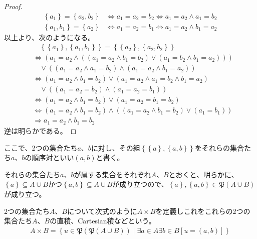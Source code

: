 \documentclass[a4paper]{jsarticle}
\begin{document}
\begin{proof}
\begin{align*}
\left\{ a_{1} \right\} = \left\{ a_{2},b_{2} \right\} &\Leftrightarrow a_{1} = a_{2} = b_{2} \Leftrightarrow a_{1} = a_{2} \land a_{1} = b_{2}\\
\left\{ a_{1},b_{1} \right\} = \left\{ a_{2} \right\} &\Leftrightarrow a_{1} = a_{2} = b_{1} \Leftrightarrow a_{1} = a_{2} \land b_{1} = a_{2}
\end{align*}
以上より、次のようになる。
\begin{align*}
&\quad \left\{ \left\{ a_{1} \right\},\left\{ a_{1},b_{1} \right\} \right\} = \left\{ \left\{ a_{2} \right\},\left\{ a_{2},b_{2} \right\} \right\}\\
&\Leftrightarrow \left( a_{1} = a_{2} \land \left( \left( a_{1} = a_{2} \land b_{1} = b_{2} \right) \vee \left( a_{1} = b_{2} \land b_{1} = a_{2} \right) \right) \right) \\
&\quad \vee \left( \left( a_{1} = a_{2} \land a_{1} = b_{2} \right) \land \left( a_{1} = a_{2} \land b_{1} = a_{2} \right) \right)\\
&\Leftrightarrow \left( a_{1} = a_{2} \land b_{1} = b_{2} \right) \vee \left( a_{1} = a_{2} \land a_{1} = b_{2} \land b_{1} = a_{2} \right) \\ 
&\quad \vee \left( \left( a_{1} = a_{2} = b_{2} \right) \land \left( a_{1} = a_{2} = b_{1} \right) \right)\\
&\Leftrightarrow \left( a_{1} = a_{2} \land b_{1} = b_{2} \right) \vee \left( a_{1} = a_{2} = b_{1} = b_{2} \right)\\
&\Leftrightarrow \left( a_{1} = a_{2} \land b_{1} = b_{2} \right) \land \left( \left( a_{1} = a_{2} \land b_{1} = b_{2} \right) \vee \left( a_{1} = b_{1} \right) \right)\\
&\Rightarrow a_{1} = a_{2} \land b_{1} = b_{2}
\end{align*}
逆は明らかである。
\end{proof}
\begin{dfn}
ここで、2つの集合たち$a$、$b$に対し、その組$\left\{ \left\{ a \right\},\left\{ a,b \right\} \right\}$をそれらの集合たち$a$、$b$の順序対といい$(a,b)$と書く。
\end{dfn}
それらの集合たち$a$、$b$が属する集合をそれぞれ$A$、$B$とおくと、明らかに、$\left\{ a \right\} \subseteq A \cup B$かつ$\left\{ a,b \right\} \subseteq A \cup B$が成り立つので、$\left\{ a \right\},\left\{ a,b \right\} \in \mathfrak{P}(A \cup B)$が成り立つ。
\begin{dfn}
2つの集合たち$A$、$B$について次式のように$A \times B$を定義しこれをこれらの2つの集合たち$A$、$B$の直積、Cartesian積などという。
\begin{align*}
A \times B = \left\{ u \in \mathfrak{P}\left( \mathfrak{P}(A \cup B) \right) \middle| \exists a \in A\exists b \in B\left[ u = (a,b) \right] \right\}
\end{align*}
\end{dfn}
\end{document}
